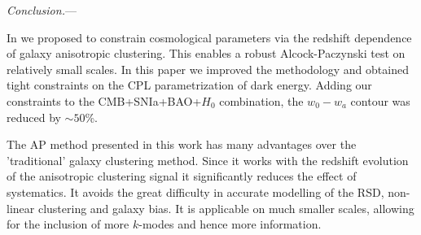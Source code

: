 \documentclass[prl,twocolumn,superscriptaddress,aps,amsmath,amssymb,nofootinbib,altaffilletter]{revtex4}
\begin{document}
{\it Conclusion.}---

In \cite{Li2016} we proposed to constrain cosmological parameters via 
the redshift dependence of galaxy anisotropic clustering. 
This enables a robust Alcock-Paczynski test on relatively small scales.
In this paper we improved the methodology and obtained tight constraints on the CPL parametrization of dark energy. 
Adding our constraints to the CMB+SNIa+BAO+$H_0$ combination, the $w_0-w_a$ contour was reduced by $\sim50$\%.

The AP method presented in this work has many advantages over the 'traditional' galaxy clustering method.
Since it works with the redshift evolution of the anisotropic clustering signal it significantly reduces the effect of systematics. 
It avoids the great difficulty in accurate modelling of the RSD, non-linear clustering and galaxy bias.
It is applicable on much smaller scales, allowing for the inclusion of more $k$-modes and hence more information. 




%
\end{document}
